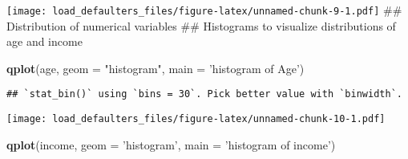 \documentclass[]{article}
\newenvironment{Shaded}{\begin{snugshade}}{\end{snugshade}}
\newcommand{\DataTypeTok}[1]{\textcolor[rgb]{0.13,0.29,0.53}{#1}}
\newcommand{\DecValTok}[1]{\textcolor[rgb]{0.00,0.00,0.81}{#1}}
\newcommand{\KeywordTok}[1]{\textcolor[rgb]{0.13,0.29,0.53}{\textbf{#1}}}
\newcommand{\NormalTok}[1]{#1}
\newcommand{\OperatorTok}[1]{\textcolor[rgb]{0.81,0.36,0.00}{\textbf{#1}}}
\newcommand{\StringTok}[1]{\textcolor[rgb]{0.31,0.60,0.02}{#1}}
\begin{document}
\begin{Shaded}
\end{Shaded}

\texttt{[image: load\_defaulters\_files/figure-latex/unnamed-chunk-9-1.pdf]}
\#\# Distribution of numerical variables \#\# Histograms to visualize
distributions of age and income

\begin{Shaded}
\begin{Highlighting}[]
\KeywordTok{qplot}\NormalTok{(age, }\DataTypeTok{geom =} \StringTok{"histogram"}\NormalTok{, }\DataTypeTok{main =} \StringTok{'histogram of Age'}\NormalTok{)}
\end{Highlighting}
\end{Shaded}

\begin{verbatim}
## `stat_bin()` using `bins = 30`. Pick better value with `binwidth`.
\end{verbatim}

\texttt{[image: load\_defaulters\_files/figure-latex/unnamed-chunk-10-1.pdf]}

\begin{Shaded}
\begin{Highlighting}[]
\KeywordTok{qplot}\NormalTok{(income, }\DataTypeTok{geom =} \StringTok{'histogram'}\NormalTok{, }\DataTypeTok{main =} \StringTok{'histogram of income'}\NormalTok{)}
\end{Highlighting}
\end{Shaded}
\end{document}
